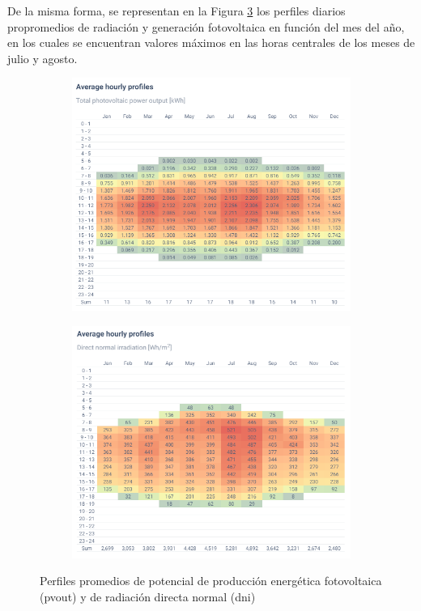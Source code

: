 De la misma forma, se representan en la Figura \ref{fig:averagehour} los perfiles diarios propromedios de radiación y generación fotovoltaica en función del mes del año, en los cuales se encuentran valores máximos en las horas centrales de los meses de julio y agosto. 

\begin{figure}[H]
    \centering    
    \begin{subfigure}{0.75\linewidth}
        \centering
        \includegraphics[width=\linewidth]{img/diseno/averagepvouthour.png}
        \label{fig:averagepvouthour}
    \end{subfigure}\hfill

    \begin{subfigure}{0.75\linewidth}
        \centering
        \includegraphics[width=\linewidth]{img/diseno/averagednihour.png}
        \label{fig:averagepdnihour}
    \end{subfigure}    
    \caption{Perfiles promedios de potencial de producción energética fotovoltaica (\acrshort{pvout}) y de radiación directa normal (\acrshort{dni}) \cite{globalsolar}}
    \label{fig:averagehour}
\end{figure}

